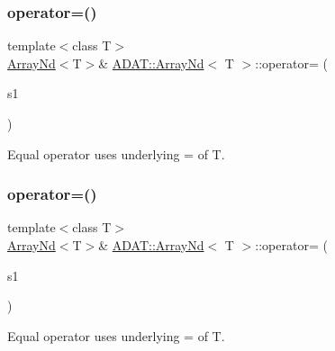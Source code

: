 \subsubsection{\texorpdfstring{operator=()}{operator=()}\hspace{0.1cm}{\footnotesize\ttfamily [1/15]}}
{\footnotesize\ttfamily template$<$class T$>$ \\
\mbox{\hyperlink{classADAT_1_1ArrayNd}{Array\+Nd}}$<$T$>$\& \mbox{\hyperlink{classADAT_1_1ArrayNd}{A\+D\+A\+T\+::\+Array\+Nd}}$<$ T $>$\+::operator= (\begin{DoxyParamCaption}\item[{const \mbox{\hyperlink{classADAT_1_1ArrayNd}{Array\+Nd}}$<$ T $>$ \&}]{s1 }\end{DoxyParamCaption})\hspace{0.3cm}{\ttfamily [inline]}}



Equal operator uses underlying = of T. 

\mbox{\label{classADAT_1_1ArrayNd_ae3c6bdf408c630fc44a7c6dcdac94ae1}} 
\subsubsection{\texorpdfstring{operator=()}{operator=()}\hspace{0.1cm}{\footnotesize\ttfamily [2/15]}}
{\footnotesize\ttfamily template$<$class T$>$ \\
\mbox{\hyperlink{classADAT_1_1ArrayNd}{Array\+Nd}}$<$T$>$\& \mbox{\hyperlink{classADAT_1_1ArrayNd}{A\+D\+A\+T\+::\+Array\+Nd}}$<$ T $>$\+::operator= (\begin{DoxyParamCaption}\item[{const \mbox{\hyperlink{classADAT_1_1ArrayNd}{Array\+Nd}}$<$ T $>$ \&}]{s1 }\end{DoxyParamCaption})\hspace{0.3cm}{\ttfamily [inline]}}



Equal operator uses underlying = of T. 

\mbox{\label{classADAT_1_1ArrayNd_ae3c6bdf408c630fc44a7c6dcdac94ae1}} 
